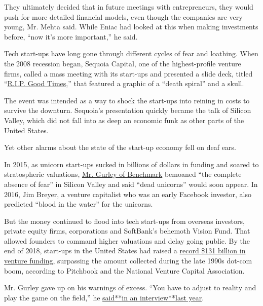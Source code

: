 They ultimately decided that in future meetings with entrepreneurs, they
would push for more detailed financial models, even though the companies
are very young, Mr. Mehta said. While Eniac had looked at this when
making investments before, ``now it's more important,'' he said.

Tech start-ups have long gone through different cycles of fear and
loathing. When the 2008 recession began, Sequoia Capital, one of the
highest-profile venture firms, called a mass meeting with its start-ups
and presented a slide deck, titled
``\href{https://www.sequoiacap.com/article/rip-good-times}{R.I.P. Good
Times},'' that featured a graphic of a ``death spiral'' and a skull.

The event was intended as a way to shock the start-ups into reining in
costs to survive the downturn. Sequoia's presentation quickly became the
talk of Silicon Valley, which did not fall into as deep an economic funk
as other parts of the United States.

Yet other alarms about the state of the start-up economy fell on deaf
ears.

In 2015, as unicorn start-ups sucked in billions of dollars in funding
and soared to stratospheric valuations,
\href{https://www.nytimes3xbfgragh.onion/2017/03/18/technology/bill-gurley-uber-travis-kalanick-silicon-valley.html}{Mr.
Gurley of Benchmark} bemoaned ``the complete absence of fear'' in
Silicon Valley and said ``dead unicorns'' would soon appear. In 2016,
Jim Breyer, a venture capitalist who was an early Facebook investor,
also predicted ``blood in the water'' for the unicorns.

But the money continued to flood into tech start-ups from overseas
investors, private equity firms, corporations and SoftBank's behemoth
Vision Fund. That allowed founders to command higher valuations and
delay going public. By the end of 2018, start-ups in the United States
had raised a
\href{https://pitchbook.com/media/press-releases/us-venture-capital-investment-reached-1309-billion-in-2018-surpassing-dot-com-era}{record
\$131 billion in venture funding}, surpassing the amount collected
during the late 1990s dot-com boom, according to Pitchbook and the
National Venture Capital Association.

Mr. Gurley gave up on his warnings of excess. ``You have to adjust to
reality and play the game on the field,'' he
\href{https://www.nytimes3xbfgragh.onion/2018/08/14/technology/venture-capital-mega-round.html}{said}\href{https://www.nytimes3xbfgragh.onion/2018/08/14/technology/venture-capital-mega-round.html}{**}\href{https://www.nytimes3xbfgragh.onion/2018/08/14/technology/venture-capital-mega-round.html}{in
an
interview}\href{https://www.nytimes3xbfgragh.onion/2018/08/14/technology/venture-capital-mega-round.html}{**}\href{https://www.nytimes3xbfgragh.onion/2018/08/14/technology/venture-capital-mega-round.html}{last
year}.


